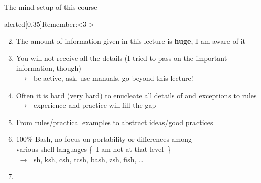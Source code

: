 \begin{frame}{The mind setup of this course}
    \vspace{-3mm}
    \begin{varblock}{alerted}[0.35\textwidth]{Remember:}<3->
    \end{varblock}
    \vspace{1mm}
    \begin{enumerate}
        \setcounter{enumi}{1}
        \item<3-> The amount of information given in this lecture is \textbf{huge}, I am aware of it
        \item<3-> You will not receive all the details (I tried to pass on the important information, though)\\
                  $\;\to\;$ be active, ask, use manuals, go beyond this lecture!
        \item<4-> Often it is hard (very hard) to enucleate all details of and exceptions to rules \\
                  $\;\to\;$ experience and practice will fill the gap
        \item<4-> From rules/practical examples to abstract ideas/good practices
        \item<5-> 100\% Bash, no focus on portability or differences among \\ various shell languages {\tiny \{~I am not at that level~\}}\\
                  $\;\to\;$ sh, ksh, csh, tcsh, bash, zsh, fish, \ldots
        \setcounter{enumi}{0}
        \item<2-> \\
    \end{enumerate}
\end{frame}
